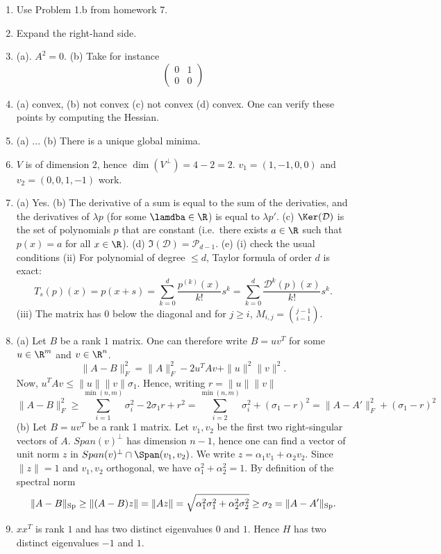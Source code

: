 \documentclass[11pt,nocut]{article}
\begin{document}
\begin{enumerate}
	\item Use Problem 1.b from homework 7.
	\item Expand the right-hand side.
	\item (a). $A^2 = 0$. (b) Take for instance
		$$
		\begin{pmatrix}
			0 & 1 \\
			0 & 0
		\end{pmatrix}
		$$
	\item (a) convex, (b) not convex (c) not convex (d) convex. One can verify these points by computing the Hessian.
	\item (a) ... (b) There is a unique global minima.
	\item $V$ is of dimension $2$, hence $\dim(V^{\perp}) = 4-2 = 2$. $v_1 = (1,-1,0,0)$ and $v_2 = (0, 0, 1,-1)$ work.
	\item (a) Yes. (b) The derivative of a sum is equal to the sum of the derivaties, and the derivatives of $\lambda p$ (for some $\lamdba \in \R$) is equal to $\lambda p'$.
		(c) $\Ker(\mathcal{D})$ is the set of polynomials $p$ that are constant (i.e.\ there exists $a\in\R$ such that $p(x) =a$ for all $x \in \R$).
		(d) $\Im(\mathcal{D}) = \mathcal{P}_{d-1}$.
		(e) (i) check the usual conditions (ii) For polynomial of degree $\leq d$, Taylor formula of order $d$ is exact:
		$$
		T_s(p)(x) = p(x+s) = \sum_{k=0}^d \frac{p^{(k)}(x)}{k!}s^k = \sum_{k=0}^d \frac{\mathcal{D}^k(p)(x)}{k!}s^k.
		$$
		(iii) The matrix has $0$ below the diagonal and for $j \geq i$, $M_{i,j} = \binom{j-1}{i-1}$.
	\item (a) Let $B$ be a rank $1$ matrix. One can therefore write $B = u v^T$ for some $u \in \R^m$ and $v \in \R^n$.
		$$
		\|A-B\|_F^2 = \|A\|^2_F - 2 u^T A v + \|u\|^2 \|v\|^2.
		$$
		Now, $u^T Av \leq \|u\| \|v\| \sigma_1$. Hence, writing $r=\|u\|\|v\|$
		$$
		\|A-B\|_F^2 \geq \sum_{i=1}^{\min(n,m)} \sigma_i^2 - 2 \sigma_1 r + r^2
		= \sum_{i=2}^{\min(n,m)} \sigma_i^2 + (\sigma_1 -r)^2
		= \|A-A'\|_{F}^2 + (\sigma_1 - r)^2
		$$
		(b) Let $B = u v^T$ be a rank 1 matrix. Let $v_1, v_2$ be the first two right-singular vectors of $A$. $Span(v)^{\perp}$ has dimension $n-1$, hence one can find a vector of unit norm $z$ in $Span(v)^{\perp} \cap \Span(v_1,v_2)$. We write $z = \alpha_1 v_1 + \alpha_2 v_2$. Since $\|z\|=1$ and $v_1, v_2$ orthogonal, we have $\alpha_1^2 + \alpha_2^2 = 1$. By definition of the spectral norm
		$$
		\|A-B\|_{\rm Sp} \geq \|(A-B)z\| = \|Az\| = \sqrt{\alpha_1^2 \sigma_1^2 + \alpha_2^2 \sigma_2^2} \geq \sigma_2 =  \|A-A'\|_{\rm Sp}.
		$$
	\item $xx^T$ is rank $1$ and has two distinct eigenvalues $0$ and $1$. Hence $H$ has two distinct eigenvalues $-1$ and $1$.

\end{enumerate}
\end{document}
